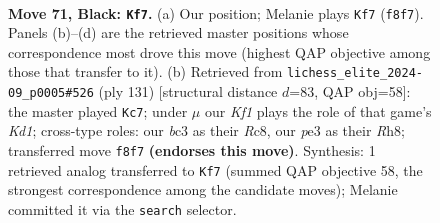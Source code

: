 \documentclass[11pt]{article}
\begin{document}
\begin{figure}[p]\centering
\begin{subfigure}{0.46\textwidth}\centering
\resizebox{\linewidth}{!}{%
\newchessgame
\chessboard[
  setfen={5k2/6p1/p2b2rr/Pppb1p1p/2p2P1P/2B1P1P1/1P3K1N/2R3R1 b - - 15 71},
  showmover=false,
  pgfstyle=straightmove, color=movearrow, markmove={f8-f7}
]}
\caption{}
\end{subfigure}\hfill
\begin{subfigure}{0.46\textwidth}\centering
\resizebox{\linewidth}{!}{%
\newchessgame
\chessboard[
  setfen={2rk3r/3b1p2/4p1p1/1p1pP2p/pP3P2/P1P1K1P1/2R1B2P/3R4 b - - 72 66},
  showmover=false,
  pgfstyle=straightmove, color=movearrow, markmove={d8-c7}
]}
\caption{}
\end{subfigure}
\\[4pt]

\caption{\textbf{Move 71, Black: \texttt{Kf7}.} (a) Our position; Melanie plays \texttt{Kf7} (\texttt{f8f7}). Panels (b)--(d) are the retrieved master positions whose correspondence most drove this move (highest QAP objective among those that transfer to it). (b) Retrieved from \texttt{lichess\_elite\_2024-09\_p0005\#526} (ply 131) [structural distance $d$=83, QAP obj=58]: the master played \texttt{Kc7}; under $\mu$ our \emph{Kf1} plays the role of that game's \emph{Kd1}; cross-type roles: our \emph{b}c3 as their \emph{R}c8, our \emph{p}e3 as their \emph{R}h8; transferred move \texttt{f8f7} \textbf{(endorses this move)}. Synthesis: 1 retrieved analog transferred to \texttt{Kf7} (summed QAP objective 58, the strongest correspondence among the candidate moves); Melanie committed it via the \texttt{search} selector.}
\label{fig:thought-m141}
\end{figure}

\clearpage
\end{document}

